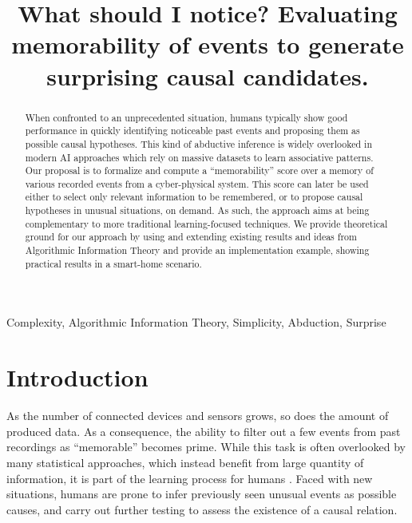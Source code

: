 \documentclass[conference]{IEEEtran}
\begin{document}
\title{
  What should I notice? Evaluating memorability of events to generate surprising causal candidates.
}
\author{

}

\maketitle

\begin{abstract}
  When confronted to an unprecedented situation, humans typically show good
  performance in quickly identifying noticeable past events and proposing them
  as possible causal hypotheses. This kind of abductive inference is widely
  overlooked in modern AI approaches which rely on massive datasets to learn
  associative patterns. Our proposal is to formalize and compute a ``memorability''
  score over a memory of various recorded events from a cyber-physical system.
 This score can later be used either to select only relevant information to be
 remembered, or to propose causal hypotheses in unusual situations, on demand.
 As such, the approach aims at being complementary to more traditional
 learning-focused techniques. We provide theoretical ground for our approach by
 using and extending existing results and ideas from Algorithmic Information
 Theory and provide an implementation example, showing practical results in a
 smart-home scenario.
\end{abstract}

\begin{IEEEkeywords}
  Complexity, Algorithmic Information Theory, Simplicity, Abduction, Surprise
\end{IEEEkeywords}

\section{Introduction}

As the number of connected devices and sensors grows, so does the amount of
produced data. As a consequence, the ability to filter out a few events from past recordings
as ``memorable'' becomes prime. While this task is often overlooked by many
statistical approaches, which instead benefit from large quantity of
information, it is part of the learning process for humans
\cite{dehaene_how_2020}. Faced with new situations, humans are prone to infer
previously seen unusual events as possible causes, and carry out further testing
to assess the existence of a causal relation.
\end{document}
